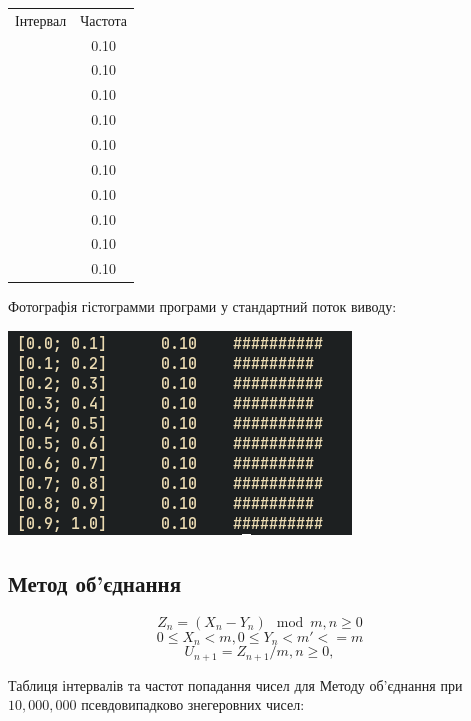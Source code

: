 \documentclass[a4paper,12pt]{report}
\begin{document}
\begin{table}[ht]
\centering %
\begin{tabular}{c c} %
  Інтервал & Частота \\\relax
  [0.0; 0.1] & 0.10 \\\relax
  [0.1; 0.2] & 0.10 \\\relax
  [0.2; 0.3] & 0.10 \\\relax
  [0.3; 0.4] & 0.10 \\\relax
  [0.4; 0.5] & 0.10 \\\relax
  [0.5; 0.6] & 0.10 \\\relax
  [0.6; 0.7] & 0.10 \\\relax
  [0.7; 0.8] & 0.10 \\\relax
  [0.8; 0.9] & 0.10 \\\relax
  [0.9; 1.0] & 0.10
\end{tabular}
\end{table}
Фотографія гістограмми програми у стандартний поток виводу:
\begin{center}\includegraphics[scale=0.5]{inverse}\end{center}

\subsection{Метод об’єднання}
\[Z_{n}=(X_{n}  - Y_{n})\mod m, n \ge 0\]
\[0 \le X_{n} < m, 0 \le Y_{n} < m' <= m\]
\[U_{n+1} = Z_{n+1}/m, n\ge0, \]

Таблиця інтервалів та частот попадання чисел для Методу об’єднання при $10,000,000$ псевдовипадково знегеровних чисел:
\end{document}
